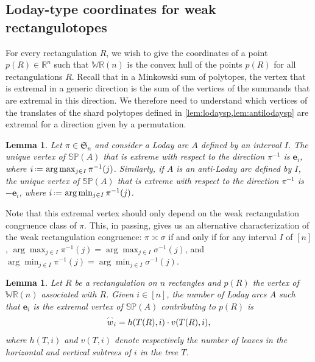 \documentclass{amsart}
\newtheorem{lemma}[theorem]{Lemma}
\theoremstyle{definition}
\newcommand{\R}{\mathbb{R}} %
\renewcommand{\b}[1]{{\boldsymbol{#1}}} %
\newcommand{\f}[1]{\mathfrak{#1}} %
\newcommand{\eqdef}{\mbox{\,\raisebox{0.2ex}{\scriptsize\ensuremath{\mathrm:}}\ensuremath{=}\,}} %
\newcommand{\polytope}[1]{\mathds{#1}} %
\newcommand{\WRP}{\polytope{WR}} %
\newcommand{\SP}{\polytope{SP}}
\newcommand{\loday}[1]{\smash{\overset{\frown}{#1}}}
\newcommand{
\weakeq}{\asymp}
\begin{document}
\subsection{Loday-type coordinates for weak rectangulotopes}

For every rectangulation $R$, we wish to give the coordinates of a point $p(R)\in\R^n$ such that $\WRP(n)$ is the convex hull of the points $p(R)$ for all rectangulations $R$.
Recall that in a Minkowski sum of polytopes, the vertex that is extremal in a generic direction is the sum of the vertices of the summands that are extremal in this direction.
We therefore need to understand which vertices of the translates of the shard polytopes defined in \cref{lem:lodaysp,lem:antilodaysp} are extremal for a direction given by a permutation.

\begin{lemma}
  \label{lem:lodaymax}
  Let $\pi\in\f{S}_n$ and consider a Loday arc $A$ defined by an interval $I$.
  The unique vertex of $\SP(A)$ that is extreme with respect to the direction $\pi^{-1}$
  is $\b{e}_i$, where $i \eqdef \arg\max_{j\in I} \pi^{-1}(j)$.
  Similarly, if $A$ is an anti-Loday arc defined by $I$, the unique vertex of $\SP(A)$ that is extreme with respect to the direction $\pi^{-1}$
  is $-\b{e}_i$, where $i \eqdef \arg\min_{j\in I} \pi^{-1}(j)$.
\end{lemma}

Note that this extremal vertex should only depend on the weak rectangulation congruence class of $\pi$.
This, in passing, gives us an alternative characterization of the weak rectangulation congruence:
$\pi
\weakeq\sigma$ if and only if for any interval $I$ of $[n]$,
$\arg\max_{j\in I} \pi^{-1}(j)=\arg\max_{j\in I} \sigma^{-1}(j)$, and
$\arg\min_{j\in I} \pi^{-1}(j)=\arg\min_{j\in I} \sigma^{-1}(j)$.

\begin{lemma}
  Let $R$ be a rectangulation on $n$ rectangles and $p(R)$ the vertex of $\WRP(n)$ associated with $R$.
  Given $i\in [n]$, the number of Loday arcs $A$ such that $\b{e}_i$ is the extremal vertex of $\SP(A)$ contributing to $p(R)$ is
  \[
  \loday{w}_i =  h(T(R), i)\cdot v(T(R),i),
  \]
   where $h(T,i)$ and $v(T,i)$ denote respectively the number of leaves in the horizontal and vertical subtrees of $i$ in the tree $T$.
\end{lemma}

\end{document}

